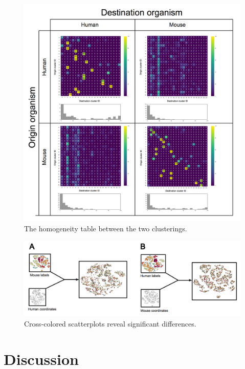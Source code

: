 \documentclass[12pt,oneside,onecolumn,a4paper]{article}
\begin{document}
\begin{figure}[H]
\begin{center}
\includegraphics[width=\columnwidth]{figures/homogeneity_min}
\caption{The homogeneity table between the two clusterings. \label{fig:homogeneity_table}%
}
\end{center}
\end{figure}

\begin{figure}[H]
\begin{center}
\includegraphics[width=\columnwidth]{figures/cross_comparison}
\caption{Cross-colored scatterplots reveal significant differences. \label{fig:cross_scatter}%
}
\end{center}
\end{figure}

\section{Discussion}
\end{document}
